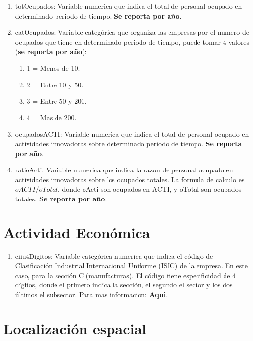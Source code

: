 \documentclass[12pt,a4paper]{article}
\begin{document}
\begin{enumerate}
	\item totOcupados: Variable numerica que indica el total de personal ocupado en determinado periodo de tiempo. \textbf{Se reporta por año}.
	\item catOcupados: Variable categórica que organiza las empresas por el numero de ocupados que tiene en determinado periodo de tiempo, puede tomar 4 valores (\textbf{se reporta por año}):
	\begin{enumerate}
		\item 1 = Menos de 10.
		\item 2 = Entre 10 y 50.
		\item 3 = Entre 50 y 200.
		\item 4 = Mas de 200.
	\end{enumerate}
	\item ocupadosACTI: Variable numerica que indica el total de personal ocupado en actividades innovadoras sobre determinado periodo de tiempo. \textbf{Se reporta por año}.
	\item ratioActi: Variable numerica que indica la razon de personal ocupado en actividades innovadoras sobre los ocupados totales. La formula de calculo es $ oACTI/ oTotal $, donde oActi son ocupados en ACTI, y oTotal son ocupados totales. \textbf{Se reporta por año}.
\end{enumerate}

\section{Actividad Económica}

\begin{enumerate}
	\item ciiu4Digitos: Variable categórica numerica que indica el código de Clasificación Industrial Internacional Uniforme (ISIC) de la empresa. En este caso, para la sección C (manufacturas). El código tiene especificidad de 4 dígitos, donde el primero indica la sección, el segundo el sector y los dos últimos el subsector. Para mas informacion:  \href{https://www.dane.gov.co/files/sen/nomenclatura/ciiu/CIIU_Rev_4_AC2020.pdf}{\textbf{Aqui}}.
\end{enumerate}

\section{Localización espacial}
\end{document}
